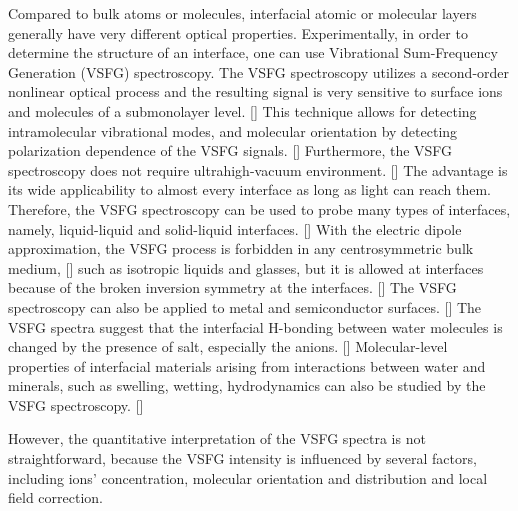 Compared to bulk atoms or molecules,
interfacial atomic or molecular layers generally have very different optical properties. 
Experimentally, in order to determine the structure of an interface, one can use Vibrational Sum-Frequency Generation (VSFG) spectroscopy.
The VSFG spectroscopy utilizes a second-order nonlinear optical process and the resulting signal is very sensitive to surface ions and 
molecules of a submonolayer level. [\cite{Morita2008,WangHongFei2015,WenYuChieh2016,Ishiyama2017,Penalber-Johnstone2018}] 
This technique allows for detecting intramolecular vibrational modes, and molecular orientation by detecting polarization dependence of the VSFG signals. [\cite{Vidal05}]  
Furthermore, the VSFG spectroscopy does not require ultrahigh-vacuum environment. [\cite{WeiX02}]
The advantage is its wide applicability to almost every interface as long as light can reach them. 
Therefore, the VSFG spectroscopy can be used to probe many types of interfaces, namely, liquid-liquid and 
solid-liquid interfaces. [\cite{Guyot-Sionnest1987,RS91,Du93,QD94,Richmond02,Gopalakrishnan2006,ShenYR2006,Morita2008}]
With the electric dipole approximation, the VSFG process is forbidden in any centrosymmetric bulk medium, [\cite{Che12}] 
such as isotropic liquids and glasses,  but it is allowed at interfaces because of the broken inversion symmetry at the interfaces. [\cite{PF00}]
The VSFG spectroscopy can also be applied to metal and semiconductor surfaces. [\cite{Harris87,Superfine88}]
The VSFG spectra suggest that the interfacial H-bonding between water molecules is changed by the presence of salt, 
especially the anions. [\cite{EAR04}]
Molecular-level properties of interfacial materials arising from interactions between water and minerals, 
such as swelling, wetting, hydrodynamics can also be studied by the VSFG spectroscopy. [\cite{Rotenberg14}]

However, the quantitative interpretation of the VSFG spectra is not straightforward,
because the VSFG intensity is influenced by several factors, including ions' concentration, 
molecular orientation and distribution and local field correction. \cite{Morita2008}

